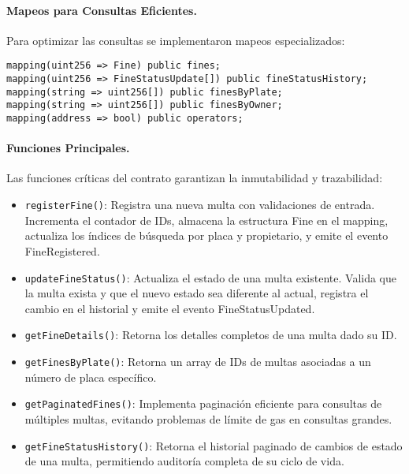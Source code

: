 \paragraph{Mapeos para Consultas Eficientes.}
Para optimizar las consultas se implementaron mapeos especializados:

\begin{verbatim}
mapping(uint256 => Fine) public fines;
mapping(uint256 => FineStatusUpdate[]) public fineStatusHistory;
mapping(string => uint256[]) public finesByPlate;
mapping(string => uint256[]) public finesByOwner;
mapping(address => bool) public operators;
\end{verbatim}

\paragraph{Funciones Principales.}
Las funciones críticas del contrato garantizan la inmutabilidad y trazabilidad:

\begin{itemize}
    \item \texttt{registerFine()}: Registra una nueva multa con validaciones de entrada. Incrementa el contador de IDs, almacena la estructura Fine en el mapping, actualiza los índices de búsqueda por placa y propietario, y emite el evento FineRegistered.
    
    \item \texttt{updateFineStatus()}: Actualiza el estado de una multa existente. Valida que la multa exista y que el nuevo estado sea diferente al actual, registra el cambio en el historial y emite el evento FineStatusUpdated.
    
    \item \texttt{getFineDetails()}: Retorna los detalles completos de una multa dado su ID.
    
    \item \texttt{getFinesByPlate()}: Retorna un array de IDs de multas asociadas a un número de placa específico.
    
    \item \texttt{getPaginatedFines()}: Implementa paginación eficiente para consultas de múltiples multas, evitando problemas de límite de gas en consultas grandes.
    
    \item \texttt{getFineStatusHistory()}: Retorna el historial paginado de cambios de estado de una multa, permitiendo auditoría completa de su ciclo de vida.
\end{itemize}

